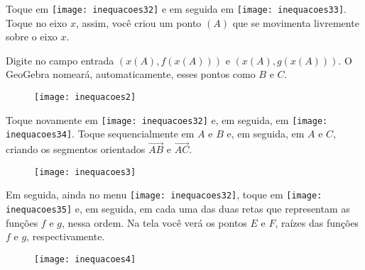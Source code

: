 \documentclass[10 pt,usenames,dvipsnames, oneside]{article}
\begin{document}
Toque em \texttt{[image: inequacoes32]} e em seguida em \texttt{[image: inequacoes33]}. Toque no eixo $x$, assim, você criou um ponto $(A)$ que se movimenta livremente sobre o eixo $x$.

Digite no campo entrada $(x(A),f(x(A)))$ e $(x(A),g(x(A)))$. O GeoGebra nomeará, automaticamente, esses pontos como $B$ e $C$.

\begin{figure}[H]
\centering

\texttt{[image: inequacoes2]}
\end{figure}

Toque novamente em \texttt{[image: inequacoes32]} e, em seguida, em \texttt{[image: inequacoes34]}. Toque sequencialmente em $A$ e $B$ e, em seguida, em $A$ e $C$, criando os segmentos orientados $\overrightarrow{AB}$ e $\overrightarrow{AC}$. 

\begin{figure}[H]
\centering

\texttt{[image: inequacoes3]}
\end{figure}

Em seguida, ainda no menu  \texttt{[image: inequacoes32]}, toque em \texttt{[image: inequacoes35]} e, em seguida, em cada uma das duas retas que representam as funções $f$ e $g$, nessa ordem. Na tela você verá os pontos $E$ e $F$, raízes das funções $f$ e $g$, respectivamente.

\begin{figure}[H]
\centering

\texttt{[image: inequacoes4]}
\end{figure}
\end{document}
